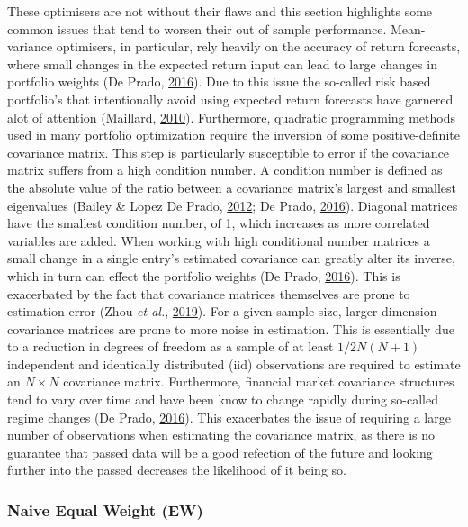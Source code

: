 \documentclass[11pt,preprint, authoryear]{elsarticle}
\numberwithin{equation}{section}
\numberwithin{figure}{section}
\numberwithin{table}{section}
\begin{document}
These optimisers are not without their flaws and this section highlights
some common issues that tend to worsen their out of sample performance.
Mean-variance optimisers, in particular, rely heavily on the accuracy of
return forecasts, where small changes in the expected return input can
lead to large changes in portfolio weights (De Prado,
\protect\hyperlink{ref-lopez}{2016}). Due to this issue the so-called
risk based portfolio's that intentionally avoid using expected return
forecasts have garnered alot of attention (Maillard,
\protect\hyperlink{ref-maillard2010}{2010}). Furthermore, quadratic
programming methods used in many portfolio optimization require the
inversion of some positive-definite covariance matrix. This step is
particularly susceptible to error if the covariance matrix suffers from
a high condition number. A condition number is defined as the absolute
value of the ratio between a covariance matrix's largest and smallest
eigenvalues (Bailey \& Lopez De Prado,
\protect\hyperlink{ref-lopez2012}{2012}; De Prado,
\protect\hyperlink{ref-lopez}{2016}). Diagonal matrices have the
smallest condition number, of 1, which increases as more correlated
variables are added. When working with high conditional number matrices
a small change in a single entry's estimated covariance can greatly
alter its inverse, which in turn can effect the portfolio weights (De
Prado, \protect\hyperlink{ref-lopez}{2016}). This is exacerbated by the
fact that covariance matrices themselves are prone to estimation error
(Zhou \emph{et al.}, \protect\hyperlink{ref-zhou2019}{2019}). For a
given sample size, larger dimension covariance matrices are prone to
more noise in estimation. This is essentially due to a reduction in
degrees of freedom as a sample of at least \(1/2N(N+1)\) independent and
identically distributed (iid) observations are required to estimate an
\(N\times N\) covariance matrix. Furthermore, financial market
covariance structures tend to vary over time and have been know to
change rapidly during so-called regime changes (De Prado,
\protect\hyperlink{ref-lopez}{2016}). This exacerbates the issue of
requiring a large number of observations when estimating the covariance
matrix, as there is no guarantee that passed data will be a good
refection of the future and looking further into the passed decreases
the likelihood of it being so.

\hypertarget{naive-equal-weight-ew}{%
\subsubsection{Naive Equal Weight (EW)}\label{naive-equal-weight-ew}}
\end{document}
